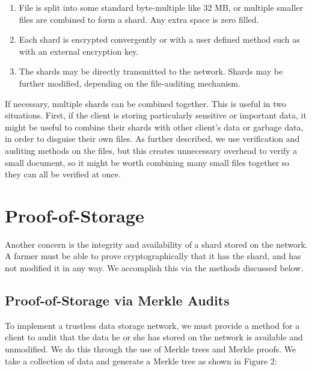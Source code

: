 \documentclass[a4paper,10pt]{article}
\begin{document}
\begin{enumerate}
\item File is split into some standard byte-multiple like 32 MB, or multiple smaller files are combined to form a shard. Any extra space is zero filled.
\item Each shard is encrypted convergently or with a user defined method such as with an external encryption key.
\item The shards may be directly transmitted to the network. Shards may be further modified, depending on the file-auditing mechanism.
\end{enumerate}

If necessary, multiple shards can be combined together. This is useful in two situations. First, if the client is storing particularly sensitive or important data, it might be useful to combine their shards with other client’s data or garbage data, in order to disguise their own files. As further described, we use verification and auditing methods on the files, but this creates unnecessary overhead to verify a small document, so it might be worth combining many small files together so they can all be verified at once.



\section{Proof-of-Storage}

Another concern is the integrity and availability of a shard stored on the network. A farmer must be able to prove cryptographically that it has the shard, and has not modified it in any way. We accomplish this via the methods discussed below.
\subsection{Proof-of-Storage via Merkle Audits}

To implement a trustless data storage network, we must provide a method for a client to audit that the data he or she has stored on the network is available and unmodified. We do this through the use of Merkle trees \cite{2} and Merkle proofs. We take a collection of data and generate a Merkle tree as shown in Figure 2:\\
\end{document}

